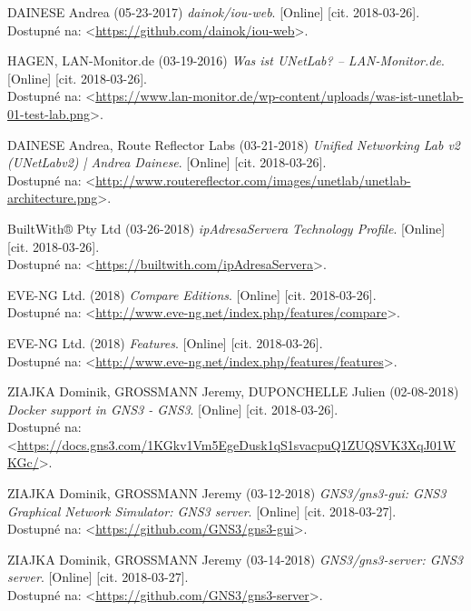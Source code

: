 \begin{thebibliography}{99}
DAINESE Andrea (05-23-2017) {\it dainok/iou-web}. [Online] [cit. 2018-03-26]. \\
Dostupné na: <\url{https://github.com/dainok/iou-web}>.

HAGEN, LAN-Monitor.de  (03-19-2016) {\it Was ist UNetLab? – LAN-Monitor.de}. [Online] [cit. 2018-03-26]. \\
Dostupné na: <\url{https://www.lan-monitor.de/wp-content/uploads/was-ist-unetlab-01-test-lab.png}>.

DAINESE Andrea, Route Reflector Labs (03-21-2018) {\it Unified Networking Lab v2 (UNetLabv2) | Andrea Dainese}. [Online] [cit. 2018-03-26]. \\
Dostupné na: <\url{http://www.routereflector.com/images/unetlab/unetlab-architecture.png}>.

BuiltWith® Pty Ltd (03-26-2018) {\it ipAdresaServera Technology Profile}. [Online] [cit. 2018-03-26]. \\
Dostupné na: <\url{https://builtwith.com/ipAdresaServera}>.

EVE-NG Ltd. (2018) {\it Compare Editions}. [Online] [cit. 2018-03-26]. \\
Dostupné na: <\url{http://www.eve-ng.net/index.php/features/compare}>.

EVE-NG Ltd. (2018) {\it Features}. [Online] [cit. 2018-03-26]. \\
Dostupné na: <\url{http://www.eve-ng.net/index.php/features/features}>.

ZIAJKA Dominik, GROSSMANN Jeremy, DUPONCHELLE Julien (02-08-2018) {\it Docker support in GNS3 - GNS3}. [Online] [cit. 2018-03-26]. \\
Dostupné na: <\url{https://docs.gns3.com/1KGkv1Vm5EgeDusk1qS1svacpuQ1ZUQSVK3XqJ01WKGc/}>.

ZIAJKA Dominik, GROSSMANN Jeremy (03-12-2018) {\it GNS3/gns3-gui: GNS3 Graphical Network Simulator: GNS3 server}. [Online] [cit. 2018-03-27]. \\
Dostupné na: <\url{https://github.com/GNS3/gns3-gui}>.

ZIAJKA Dominik, GROSSMANN Jeremy (03-14-2018) {\it GNS3/gns3-server: GNS3 server}. [Online] [cit. 2018-03-27]. \\
Dostupné na: <\url{https://github.com/GNS3/gns3-server}>.


\end{thebibliography}
